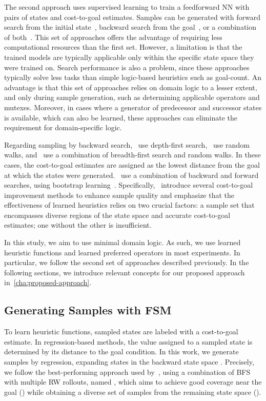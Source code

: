 \documentclass[ppgc,diss,english]{iiufrgs}
\newcommand{\pp}[2][noinline]{\todo[color=purple!50,linecolor={purple!100},#1,fancyline,author=Pedro]{#2}}
\begin{document}
The second approach uses supervised learning to train a feedforward NN with pairs of states and cost-to-goal estimates. Samples can be generated with forward search from the initial state~\cite{Ferber.etal/2020a}, backward search from the goal~\cite{Yu.etal/2020,OToole/2022,Bettker.etal/2022}, or a combination of both~\cite{Ferber.etal/2022}.
This set of approaches offers the advantage of requiring less computational resources than the first set. However, a limitation is that the trained models are typically applicable only within the specific state space they were trained on. Search performance is also a problem, since these approaches typically solve less tasks than simple logic-based heuristics such as goal-count. An advantage is that this set of approaches relies on domain logic to a lesser extent, and only during sample generation, such as determining applicable operators and mutexes. Moreover, in cases where a generator of predecessor and successor states is available, which can also be learned, these approaches can eliminate the requirement for domain-specific logic.%

Regarding sampling by backward search,~\citet{Yu.etal/2020} use depth-first search,~\citet{OToole/2022} use random walks, and~\citet{Bettker.etal/2022} use a combination of breadth-first search and random walks. In these cases, the cost-to-goal estimates are assigned as the lowest distance from the goal at which the states were generated.~\citet{Ferber.etal/2022} use a combination of backward and forward searches, using bootstrap learning~\cite{Arfaee.etal/2011}.
Specifically,~\citet{Bettker.etal/2022} introduce several cost-to-goal improvement methods to enhance sample quality and emphasize that the effectiveness of learned heuristics relies on two crucial factors: a sample set that encompasses diverse regions of the state space and accurate cost-to-goal estimates; one without the other is insufficient.

In this study, we aim to use minimal domain logic. As such, we use learned heuristic functions and learned preferred operators in most experiments. In particular, we follow the second set of approaches described previously. In the following sections, we introduce relevant concepts for our proposed approach in~\cref{cha:proposed-approach}.

\subsection{Generating Samples with FSM}
\label{sec:sample-learn-h}
To learn heuristic functions, sampled states are labeled with a cost-to-goal estimate. In regression-based methods, the value assigned to a sampled state is determined by its distance to the goal condition. In this work, we generate samples by regression, expanding states in the backward state space \bsp. Precisely, we follow the best-performing approach used by~\citet{Bettker.etal/2022}, using a combination of BFS with multiple RW rollouts, named \bfsrw, which aims to achieve good coverage near the goal (\bfs) while obtaining a diverse set of samples from the remaining state space (\rw).
\end{document}
